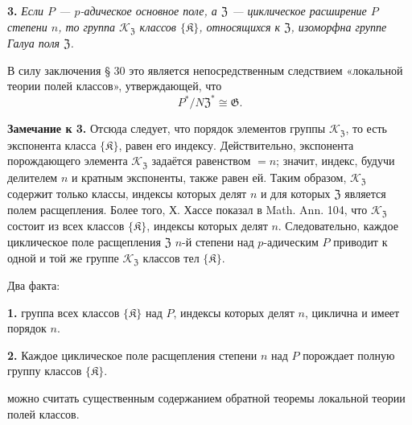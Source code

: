 \documentclass[11pt]{article}
\begin{document}
\noindent\textbf{3.} \emph{Если \(P\) --- \(p\)-адическое основное поле, а \(\mathfrak Z\) --- циклическое расширение \(P\) степени \(n\), то группа \(\mathscr K_{\mathfrak Z}\) классов \(\{\mathfrak K\}\), относящихся к \(\mathfrak Z\), изоморфна группе Галуа поля \(\mathfrak Z\).}

В силу заключения § 30 это является непосредственным следствием «локальной теории полей классов», утверждающей, что
\[
P^*/N\mathfrak Z^*\cong\mathfrak G.
\]

\noindent\textbf{Замечание к 3.} Отсюда следует, что порядок элементов группы \(\mathscr K_{\mathfrak Z}\), то есть экспонента класса \(\{\mathfrak K\}\), равен его индексу. Действительно, экспонента порождающего элемента \(\mathscr K_{\mathfrak Z}\) задаётся равенством \(=n\); значит, индекс, будучи делителем \(n\) и кратным экспоненты, также равен ей. Таким образом, \(\mathscr K_{\mathfrak Z}\) содержит только классы, индексы которых делят \(n\) и для которых \(\mathfrak Z\) является полем расщепления. Более того, Х. Хассе показал в Math. Ann. 104, что \(\mathscr K_{\mathfrak Z}\) состоит из всех классов \(\{\mathfrak K\}\), индексы которых делят \(n\). Следовательно, каждое циклическое поле расщепления \(\mathfrak Z\) \(n\)-й степени над \(p\)-адическим \(P\) приводит к одной и той же группе \(\mathscr K_{\mathfrak Z}\) классов тел \(\{\mathfrak K\}\).

Два факта:

\noindent\textbf{1.} группа всех классов \(\{\mathfrak K\}\) над \(P\), индексы которых делят \(n\), циклична и имеет порядок \(n\).

\noindent\textbf{2.} Каждое циклическое поле расщепления степени \(n\) над \(P\) порождает полную группу классов \(\{\mathfrak K\}\).

можно считать существенным содержанием обратной теоремы локальной теории полей классов.


\clearpage
\end{document}
